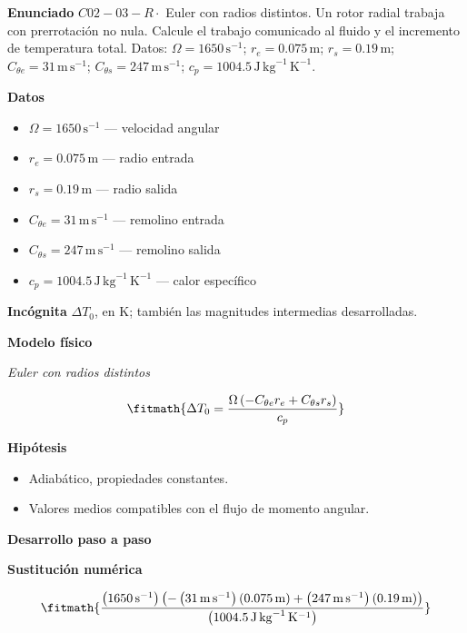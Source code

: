 \documentclass[10pt,openany]{book}
\begin{document}
\begin{tcolorbox}[title={Problema resuelto 3}, studiumworked, breakable]

\noindent\textbf{Enunciado}
\(C02-03-R \cdot\) Euler con radios distintos. Un rotor radial trabaja con prerrotación no nula. Calcule el trabajo comunicado al fluido y el incremento de temperatura total. Datos: \(\Omega=1650\, \mathrm{s}^{-1}\); \(r_e=0.075\, \mathrm{m}\); \(r_s=0.19\, \mathrm{m}\); \(C_{\theta e}=31\, \mathrm{m}\,\mathrm{s}^{-1}\); \(C_{\theta s}=247\, \mathrm{m}\,\mathrm{s}^{-1}\); \(c_p=1004.5\, \mathrm{J}\,\mathrm{kg}^{-1}\,\mathrm{K}^{-1}\).

\noindent\textbf{Datos}
\begin{itemize}
\item $\Omega = 1650\,\mathrm{s}^{-1}$ — velocidad angular
\item $r_e = 0.075\,\mathrm{m}$ — radio entrada
\item $r_s = 0.19\,\mathrm{m}$ — radio salida
\item $C_{\theta e} = 31\,\mathrm{m}\,\mathrm{s}^{-1}$ — remolino entrada
\item $C_{\theta s} = 247\,\mathrm{m}\,\mathrm{s}^{-1}$ — remolino salida
\item $c_p = 1004.5\,\mathrm{J}\,\mathrm{kg}^{-1}\,\mathrm{K}^{-1}$ — calor específico
\end{itemize}

\noindent\textbf{Incógnita}
$\Delta T_0$, en $\mathrm{K}$; también las magnitudes intermedias desarrolladas.

\noindent\textbf{Modelo físico}

\noindent\textit{Euler con radios distintos}

\[
\fitmath{\Delta T_0=\frac{\Omega \left(- C_{\theta e} r_e + C_{\theta s} r_s\right)}{c_p}}
\]

\noindent\textbf{Hipótesis}
\begin{itemize}
\item Adiabático, propiedades constantes.
\item Valores medios compatibles con el flujo de momento angular.
\end{itemize}

\noindent\textbf{Desarrollo paso a paso}



\noindent\textbf{Sustitución numérica}

\[
\fitmath{\frac{\left(1650\,\mathrm{s}^{-1}\right) \left(- \left(31\,\mathrm{m}\,\mathrm{s}^{-1}\right) \left(0.075\,\mathrm{m}\right) + \left(247\,\mathrm{m}\,\mathrm{s}^{-1}\right) \left(0.19\,\mathrm{m}\right)\right)}{\left(1004.5\,\mathrm{J}\,\mathrm{kg}^{-1}\,\mathrm{K}^{-1}\right)}}
\]


\end{tcolorbox}
\end{document}
